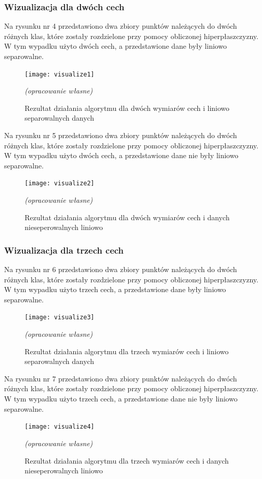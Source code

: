 \documentclass[[10pt,a4paper]{article}
\begin{document}
\subsubsection{Wizualizacja dla dwóch cech}
Na rysunku nr 4 przedstawiono dwa zbiory punktów należących do dwóch różnych klas, które zostały rozdzielone przy pomocy obliczonej hiperpłaszczyzny. W tym wypadku użyto dwóch cech, a przedstawione dane były liniowo separowalne. 
\begin{figure}[h]
\centering
\texttt{[image: visualize1]}\\
\caption{Rezultat działania algorytmu dla dwóch wymiarów cech i liniowo separowalnych danych }
\textit{(opracowanie własne)}
\end{figure}

\newpage
Na rysunku nr 5 przedstawiono dwa zbiory punktów należących do dwóch różnych klas, które zostały rozdzielone przy pomocy obliczonej hiperpłaszczyzny. W tym wypadku użyto dwóch cech, a przedstawione dane nie były liniowo separowalne. 
\begin{figure}[h]
\centering
\texttt{[image: visualize2]}\\
\caption{Rezultat działania algorytmu dla dwóch wymiarów cech i danych nieseperowalnych liniowo  }
\textit{(opracowanie własne)}
\end{figure}

\subsubsection{Wizualizacja dla trzech cech}
Na rysunku nr 6 przedstawiono dwa zbiory punktów należących do dwóch różnych klas, które zostały rozdzielone przy pomocy obliczonej hiperpłaszczyzny. W tym wypadku użyto trzech cech, a przedstawione dane  były liniowo separowalne. 

\begin{figure}[h]
\centering
\texttt{[image: visualize3]}\\
\caption{Rezultat działania algorytmu dla trzech wymiarów cech i liniowo separowalnych danych }
\textit{(opracowanie własne)}
\end{figure}

Na rysunku nr 7 przedstawiono dwa zbiory punktów należących do dwóch różnych klas, które zostały rozdzielone przy pomocy obliczonej hiperpłaszczyzny. W tym wypadku użyto trzech cech, a przedstawione dane nie były liniowo separowalne. 

\begin{figure}[h]
\centering
\texttt{[image: visualize4]}\\
\caption{Rezultat działania algorytmu dla trzech wymiarów cech i danych nieseperowalnych liniowo }
\textit{(opracowanie własne)}
\end{figure}
\end{document}
